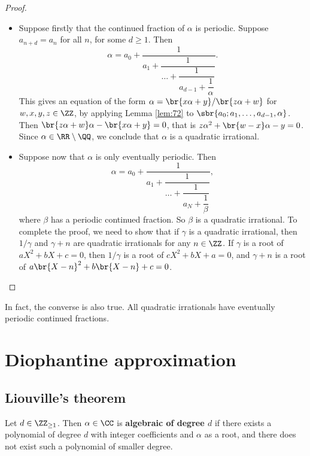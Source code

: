 \begin{proof}
\hfill
\begin{itemize}
\item Suppose firstly that the continued fraction of $ \alpha $ is periodic. Suppose $ a_{n + d} = a_n $ for all $ n $, for some $ d \ge 1 $. Then
$$ \alpha = a_0 + \dfrac{1}{a_1 + \dfrac{1}{\dots + \dfrac{1}{a_{d - 1} + \dfrac{1}{\alpha}}}}. $$
This gives an equation of the form $ \alpha = \br{x\alpha + y} / \br{z\alpha + w} $ for $ w, x, y, z \in \ZZ $, by applying Lemma \ref{lem:72} to $ \sbr{a_0; a_1, \dots, a_{d - 1}, \alpha} $. Then $ \br{z\alpha + w}\alpha - \br{x\alpha + y} = 0 $, that is $ z\alpha^2 + \br{w - x}\alpha - y = 0 $. Since $ \alpha \in \RR \setminus \QQ $, we conclude that $ \alpha $ is a quadratic irrational.
\item Suppose now that $ \alpha $ is only eventually periodic. Then
$$ \alpha = a_0 + \dfrac{1}{a_1 + \dfrac{1}{\dots + \dfrac{1}{a_N + \dfrac{1}{\beta}}}}, $$
where $ \beta $ has a periodic continued fraction. So $ \beta $ is a quadratic irrational. To complete the proof, we need to show that if $ \gamma $ is a quadratic irrational, then $ 1 / \gamma $ and $ \gamma + n $ are quadratic irrationals for any $ n \in \ZZ $. If $ \gamma $ is a root of $ aX^2 + bX + c = 0 $, then $ 1 / \gamma $ is a root of $ cX^2 + bX + a = 0 $, and $ \gamma + n $ is a root of $ a\br{X - n}^2 + b\br{X - n} + c = 0 $.
\end{itemize}
\end{proof}

In fact, the converse is also true. All quadratic irrationals have eventually periodic continued fractions.

\pagebreak

\section{Diophantine approximation}

\subsection{Liouville's theorem}

\begin{definition}
Let $ d \in \ZZ_{\ge 1} $. Then $ \alpha \in \CC $ is \textbf{algebraic of degree $ d $} if there exists a polynomial of degree $ d $ with integer coefficients and $ \alpha $ as a root, and there does not exist such a polynomial of smaller degree.
\end{definition}

